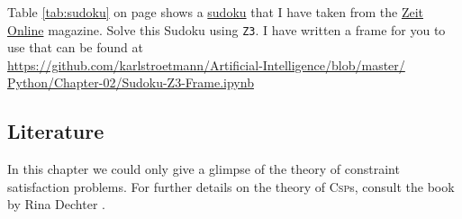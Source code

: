 \exercise
{}
Table \ref{tab:sudoku} on page \pageref{tab:sudoku} shows a \href{https://en.wikipedia.org/wiki/Sudoku}{sudoku}
that I have taken from the
\href{http://sudoku.zeit.de/cgi-bin/sudoku/sudoku_kd_app_2016.pl?action=level&kd_nr=24091123601092&year=2018&month=03&day=23&level=-c+5}{Zeit Online}
magazine.
Solve this Sudoku using \texttt{Z3}.  I have written a frame for you to use that can be found at
\\[0.2cm]
\hspace*{1.3cm}
\href{https://github.com/karlstroetmann/Artificial-Intelligence/blob/master/Python/Chapter-02/Sudoku-Z3-Frame.ipynb}{https://github.com/karlstroetmann/Artificial-Intelligence/blob/master/\\
      \hspace*{2.6cm}  
          Python/Chapter-02/Sudoku-Z3-Frame.ipynb}
    \eox
\pagebreak
    
\subsection{Literature}    
In this chapter we could only give a glimpse of the theory of constraint satisfaction problems.
For further details on the theory of \textsc{Csp}s, consult the book  by Rina Dechter
\cite{dechter:2003}.



